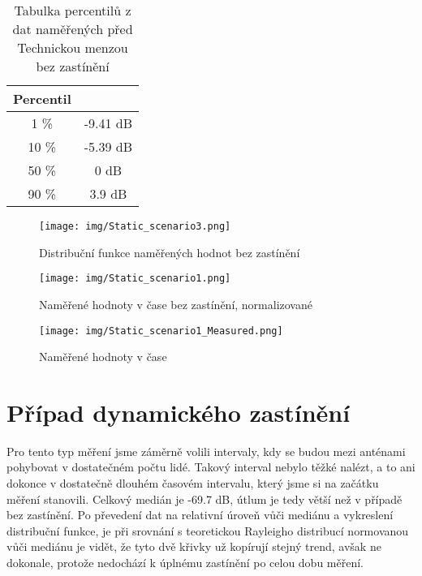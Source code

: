 \begin{table}[h!]
\centering
\begin{tabular}{|c|c|}
  \hline
   Percentil &  \\
  \hline
  1 \% & -9.41 dB\\
  \hline
  10 \% & -5.39 dB\\
  \hline
  50 \% & 0 dB \\
  \hline 
  90 \% & 3.9 dB \\
  \hline
\end{tabular}
\caption{Tabulka percentilů z dat naměřených před Technickou menzou bez zastínění}
\end{table}

\clearpage

\begin{figure}[h!]
    \centering
    \texttt{[image: img/Static\_scenario3.png]}
    \caption{Distribuční funkce naměřených hodnot bez zastínění}
    \label{fig:my_label}
\end{figure}

\begin{figure}[h!]
    \centering
    \texttt{[image: img/Static\_scenario1.png]}
    \caption{Naměřené hodnoty v čase bez zastínění, normalizované}
    \label{fig:my_label}
\end{figure}

\clearpage

\begin{figure}[h!]
    \centering
    \texttt{[image: img/Static\_scenario1\_Measured.png]}
    \caption{Naměřené hodnoty v čase}
    \label{fig:my_label}
\end{figure}

\section{Případ dynamického zastínění}
Pro tento typ měření jsme záměrně volili intervaly, kdy se budou mezi anténami pohybovat v dostatečném počtu lidé. Takový interval nebylo těžké nalézt, a to ani dokonce v dostatečně dlouhém časovém intervalu, který jsme si na začátku měření stanovili.
Celkový medián je -69.7 dB, útlum je tedy větší než v případě bez zastínění. Po převedení dat na relativní úroveň vůči mediánu a vykreslení distribuční funkce, je při srovnání s teoretickou Rayleigho distribucí normovanou vůči mediánu je vidět, že tyto dvě křivky už kopírují stejný trend, avšak ne dokonale, protože nedochází k úplnému zastínění po celou dobu měření.

